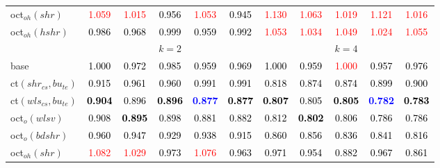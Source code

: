 \begin{tabular}[t]{l|>{}cccc>{}c|ccccc}
oct$_{oh}(shr)$ & \textcolor{red}{1.059} & \textcolor{red}{1.015} & \textcolor{black}{0.956} & \textcolor{red}{1.053} & \textcolor{black}{0.945} & \textcolor{red}{1.130} & \textcolor{red}{1.063} & \textcolor{red}{1.019} & \textcolor{red}{1.121} & \textcolor{red}{1.016}\\
oct$_{oh}(hshr)$ & \textcolor{black}{0.986} & \textcolor{black}{0.968} & \textcolor{black}{0.999} & \textcolor{black}{0.959} & \textcolor{black}{0.992} & \textcolor{red}{1.053} & \textcolor{red}{1.034} & \textcolor{red}{1.049} & \textcolor{red}{1.024} & \textcolor{red}{1.055}\\
\addlinespace[0.3em]
\multicolumn{1}{c}{} & \multicolumn{5}{c}{\textbf{$k = 2$}} & \multicolumn{5}{c}{\textbf{$k = 4$}}\\
base & \textcolor{black}{1.000} & \textcolor{black}{0.972} & \textcolor{black}{0.985} & \textcolor{black}{0.959} & \textcolor{black}{0.969} & \textcolor{black}{1.000} & \textcolor{black}{0.959} & \textcolor{red}{1.000} & \textcolor{black}{0.957} & \textcolor{black}{0.976}\\
ct$(shr_{cs}, bu_{te})$ & \textcolor{black}{0.915} & \textcolor{black}{0.961} & \textcolor{black}{0.960} & \textcolor{black}{0.991} & \textcolor{black}{0.991} & \textcolor{black}{0.818} & \textcolor{black}{0.874} & \textcolor{black}{0.874} & \textcolor{black}{0.899} & \textcolor{black}{0.900}\\
ct$(wls_{cs}, bu_{te})$ & \textcolor{black}{\textbf{0.904}} & \textcolor{black}{0.896} & \textcolor{black}{\textbf{0.896}} & \textcolor{blue}{\textbf{0.877}} & \textcolor{black}{\textbf{0.877}} & \textcolor{black}{\textbf{0.807}} & \textcolor{black}{0.805} & \textcolor{black}{\textbf{0.805}} & \textcolor{blue}{\textbf{0.782}} & \textcolor{black}{\textbf{0.783}}\\
oct$_o(wlsv)$ & \textcolor{black}{0.908} & \textcolor{black}{\textbf{0.895}} & \textcolor{black}{0.898} & \textcolor{black}{0.881} & \textcolor{black}{0.882} & \textcolor{black}{0.812} & \textcolor{black}{\textbf{0.802}} & \textcolor{black}{0.806} & \textcolor{black}{0.786} & \textcolor{black}{0.786}\\
oct$_o(bdshr)$ & \textcolor{black}{0.960} & \textcolor{black}{0.947} & \textcolor{black}{0.929} & \textcolor{black}{0.938} & \textcolor{black}{0.915} & \textcolor{black}{0.860} & \textcolor{black}{0.856} & \textcolor{black}{0.836} & \textcolor{black}{0.841} & \textcolor{black}{0.816}\\
oct$_{oh}(shr)$ & \textcolor{red}{1.082} & \textcolor{red}{1.029} & \textcolor{black}{0.973} & \textcolor{red}{1.076} & \textcolor{black}{0.963} & \textcolor{black}{0.971} & \textcolor{black}{0.954} & \textcolor{black}{0.882} & \textcolor{black}{0.967} & \textcolor{black}{0.861}\\

\end{tabular}
